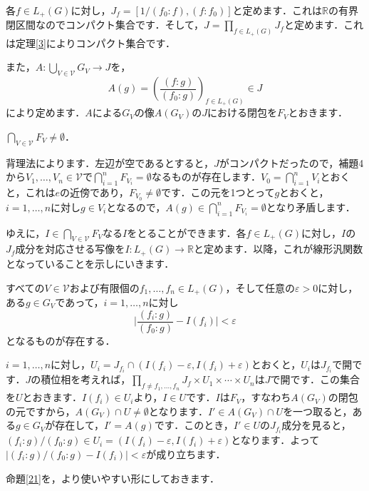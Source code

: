 各$f \in L_{+}(G)$に対し，$J_{f}=[1/ ( f_0 \colon f ) , ( f \colon f_{0} )]$と定めます．これは$\mathbb{R}$の有界閉区間なのでコンパクト集合です．そして，$J=\prod_{f \in L_{+}(G)} J_f$と定めます．これは定理\ref{3}によりコンパクト集合です．

また，$A \colon \bigcup_{V \in \mathscr{V}}G_V \to J$を，
\[
A(g)=\left( \frac{( f \colon g )}{( f_0 \colon g )} \right)_{f \in L_{+}(G)} \in J
\]
により定めます．$A$による$G_V$の像$A(G_V)$の$J$における閉包を$F_V$とおきます．
\begin{prop}\label{20}
$\bigcap_{V \in \mathscr{V}}F_V \neq \emptyset$．
\end{prop}
\begin{Proof}
背理法によります．左辺が空であるとすると，$J$がコンパクトだったので，補題4から$V_1, \ldots , V_n \in \mathscr{V}$で$\bigcap_{i=1}^{n}F_{V_i}=\emptyset$なるものが存在します．$V_0=\bigcap_{i=1}^{n}V_i$とおくと，これは$e$の近傍であり，$F_{V_0} \neq \emptyset$です．この元を1つとって$g$とおくと，$i=1, \ldots , n$に対し$g \in V_i$となるので，$A(g) \in \bigcap_{i=1}^{n}F_{V_i}=\emptyset$となり矛盾します．　
\end{Proof}

ゆえに，$I \in \bigcap_{V \in \mathscr{V}}F_V$なる$I$をとることができます．各$f \in L_{+}(G)$に対し，$I$の$J_f$成分を対応させる写像を$I \colon L_{+}(G) \to \mathbb{R}$と定めます．以降，これが線形汎関数となっていることを示しにいきます．
\begin{prop}\label{21}
すべての$V \in \mathscr{V}$および有限個の$f_1, \ldots , f_n \in L_{+}(G)$，そして任意の$\varepsilon > 0$に対し，ある$g \in G_V$であって，$i=1, \ldots , n$に対し
\[
\lvert \frac{(f_i \colon g )}{( f_0 \colon g )} -I(f_i) \lvert < \varepsilon
\]
となるものが存在する．
\end{prop}
\begin{Proof}
$i=1, \ldots , n$に対し，$U_i=J_{f_i} \cap ( I(f_i)- \varepsilon, I(f_i)+\varepsilon )$とおくと，$U_i$は$J_{f_i}$で開です．$J$の積位相を考えれば，$\prod_{f \neq f_1, \ldots , f_n}J_f \times U_1 \times \cdots \times U_n$は$J$で開です．この集合を$U$とおきます．$I(f_i) \in U_i$より，$I \in U$です．$I$は$F_V$，すなわち$A(G_V)$の閉包の元ですから，$A(G_V) \cap U \neq \emptyset$となります．$I' \in A(G_V) \cap U$を一つ取ると，ある$g \in G_V$が存在して，$I'=A(g)$です．このとき，$I' \in U$の$J_{f_i}$成分を見ると，$(f_i \colon g ) / ( f_0 \colon g ) \in U_i = ( I(f_i)- \varepsilon, I(f_i)+\varepsilon )$となります．よって$|(f_i \colon g ) / ( f_0 \colon g ) -I(f_i) | < \varepsilon$が成り立ちます．
\end{Proof}
命題\ref{21}を，より使いやすい形にしておきます．


